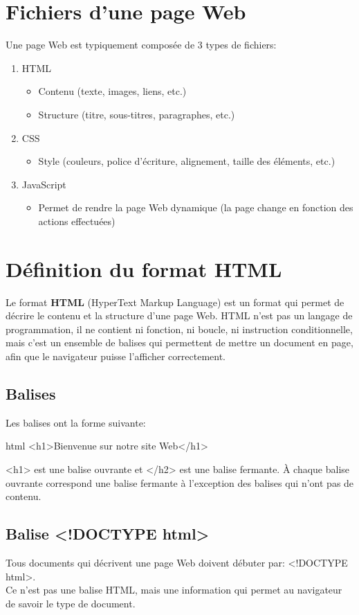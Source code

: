 \documentclass[a4paper,11pt]{article}
\begin{document}
\section{Fichiers d'une page Web}
Une page Web est typiquement composée de 3 types de fichiers:
\begin{enumerate}[label=\arabic*)]
\item HTML
\begin{itemize}
  \item Contenu (texte, images, liens, etc.)
  \item Structure (titre, sous-titres, paragraphes, etc.)
\end{itemize}
\item CSS
\begin{itemize}
  \item Style (couleurs, police d'écriture, alignement, taille des éléments, etc.)
\end{itemize}
\item JavaScript
\begin{itemize}
  \item Permet de rendre la page Web dynamique (la page change en fonction des actions effectuées)
\end{itemize}
\end{enumerate}

\section{Définition du format HTML}
Le format \textbf{HTML} (HyperText Markup Language) est un format qui permet de décrire le contenu et la structure d'une page Web. HTML n'est pas un langage de programmation, il ne contient ni fonction, ni boucle, ni instruction conditionnelle, mais c'est un ensemble de balises qui permettent de mettre un document en page, afin que le navigateur puisse l'afficher correctement.

\subsection{Balises}
Les balises ont la forme suivante:
\begin{code}{html}
<h1>Bienvenue sur notre site Web</h1>
\end{code}
<h1> est une balise ouvrante et </h2> est une balise fermante. À chaque balise ouvrante correspond une balise fermante à l'exception des balises qui n'ont pas de contenu.

\subsection{Balise <!DOCTYPE html>}
Tous documents qui décrivent une page Web doivent débuter par:  <!DOCTYPE html>.\\
Ce n'est pas une balise HTML, mais une information qui permet au navigateur de savoir le type de document.
\end{document}
